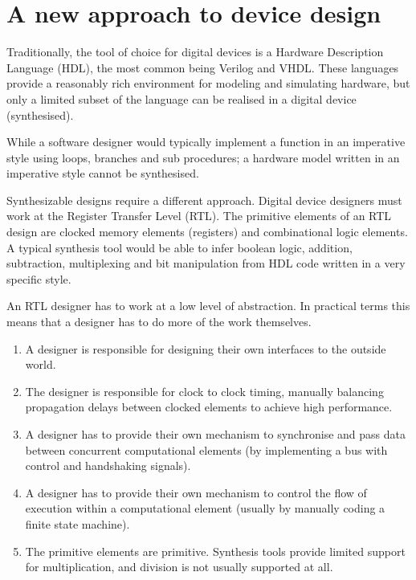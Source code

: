 \documentclass[letterpaper,10pt,english]{manual}
\begin{document}
\section{A new approach to device design}

Traditionally, the tool of choice for digital devices is a Hardware
Description Language (HDL), the most common being Verilog and VHDL. These
languages provide a reasonably rich environment for modeling and simulating
hardware, but only a limited subset of the language can be realised in a
digital device (synthesised).

While a software designer would typically implement a function in an
imperative style using loops, branches and sub procedures; a hardware model
written in an imperative style cannot be synthesised.

Synthesizable designs require a different approach. Digital device designers
must work at the Register Transfer Level (RTL). The primitive elements of an
RTL design are clocked memory elements (registers) and combinational logic
elements. A typical synthesis tool would be able to infer boolean logic,
addition, subtraction, multiplexing and bit manipulation from HDL code
written in a very specific style.

An RTL designer has to work at a low level of abstraction. In practical
terms this means that a designer has to do more of the work themselves.
\begin{enumerate}
\item {} 
A designer is responsible for designing their own interfaces to
the outside world.

\item {} 
The designer is responsible for clock to clock timing, manually
balancing propagation delays between clocked elements to achieve
high performance.

\item {} 
A designer has to provide their own mechanism to synchronise and
pass data between concurrent computational elements (by
implementing a bus with control and handshaking signals).

\item {} 
A designer has to provide their own mechanism to control the flow
of execution within a computational element (usually by manually
coding a finite state machine).

\item {} 
The primitive elements are primitive. Synthesis tools provide
limited support for multiplication, and division is not usually
supported at all.

\end{enumerate}
\end{document}
